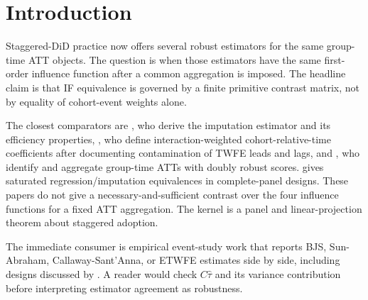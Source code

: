 \documentclass[11pt]{article}
\theoremstyle{definition}
\theoremstyle{plain}
\theoremstyle{remark}
\begin{document}
\section{Introduction}
Staggered-DiD practice now offers several robust estimators for the same group-time ATT objects. The question is when those estimators have the same first-order influence function after a common aggregation is imposed. The headline claim is that IF equivalence is governed by a finite primitive contrast matrix, not by equality of cohort-event weights alone.

The closest comparators are \citet[Sec.~5, App.~A]{borusyak_jaravel_spiess_2024_restud}, who derive the imputation estimator and its efficiency properties, \citet[Sec.~3.1--3.2]{sun_abraham_2021_joe}, who define interaction-weighted cohort-relative-time coefficients after documenting contamination of TWFE leads and lags, and \citet[Sec.~3--4]{callaway_santanna_2021_joe}, who identify and aggregate group-time ATTs with doubly robust scores. \citet[Sec.~3]{wooldridge_2023_ectj} gives saturated regression/imputation equivalences in complete-panel designs. These papers do not give a necessary-and-sufficient contrast over the four influence functions for a fixed ATT aggregation. The kernel is a panel and linear-projection theorem about staggered adoption.

The immediate consumer is empirical event-study work that reports BJS, Sun-Abraham, Callaway-Sant'Anna, or ETWFE estimates side by side, including designs discussed by \citet{roth_2026_eventstudy_note}. A reader would check \(C\widehat\tau\) and its variance contribution before interpreting estimator agreement as robustness.
\end{document}

